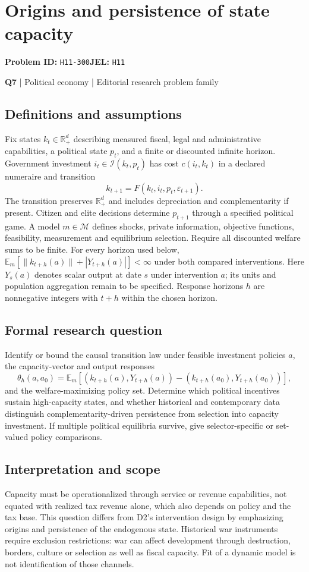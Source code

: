 \documentclass[11pt,a4paper]{article}
\begin{document}
\section*{Origins and persistence of state capacity}
\textbf{Problem ID:} \texttt{H11-300}\quad \textbf{JEL:} \texttt{H11}\par
\label{problem:OP-0127}
\label{atlas:prob:Q7}
{\sffamily\small\color{muted}\textbf{Q7} | Political economy | Editorial research problem family\par}
\subsection*{Definitions and assumptions}
Fix states $k_t\in\mathbb R_+^d$ describing measured fiscal, legal and administrative capabilities, a political state $p_t$, and a finite or discounted infinite horizon. Government investment $i_t\in\mathcal I(k_t,p_t)$ has cost $c(i_t,k_t)$ in a declared numeraire and transition
\[
k_{t+1}=F(k_t,i_t,p_t,\varepsilon_{t+1}).
\]
The transition preserves $\mathbb R_+^d$ and includes depreciation and complementarity if present. Citizen and elite decisions determine $p_{t+1}$ through a specified political game. A model $m\in\mathcal M$ defines shocks, private information, objective functions, feasibility, measurement and equilibrium selection. Require all discounted welfare sums to be finite. For every horizon used below, $\mathbb E_m[\|k_{t+h}(a)\|+|Y_{t+h}(a)|]<\infty$ under both compared interventions. Here $Y_s(a)$ denotes scalar output at date $s$ under intervention $a$; its units and population aggregation remain to be specified. Response horizons $h$ are nonnegative integers with $t+h$ within the chosen horizon.
\subsection*{Formal research question}
Identify or bound the causal transition law under feasible investment policies $a$, the capacity-vector and output responses
\[
\theta_h(a,a_0)=\mathbb E_m[(k_{t+h}(a),Y_{t+h}(a))-(k_{t+h}(a_0),Y_{t+h}(a_0))],
\]
and the welfare-maximizing policy set. Determine which political incentives sustain high-capacity states, and whether historical and contemporary data distinguish complementarity-driven persistence from selection into capacity investment. If multiple political equilibria survive, give selector-specific or set-valued policy comparisons.
\subsection*{Interpretation and scope}
Capacity must be operationalized through service or revenue capabilities, not equated with realized tax revenue alone, which also depends on policy and the tax base. This question differs from D2's intervention design by emphasizing origins and persistence of the endogenous state. Historical war instruments require exclusion restrictions: war can affect development through destruction, borders, culture or selection as well as fiscal capacity. Fit of a dynamic model is not identification of those channels.
\end{document}
